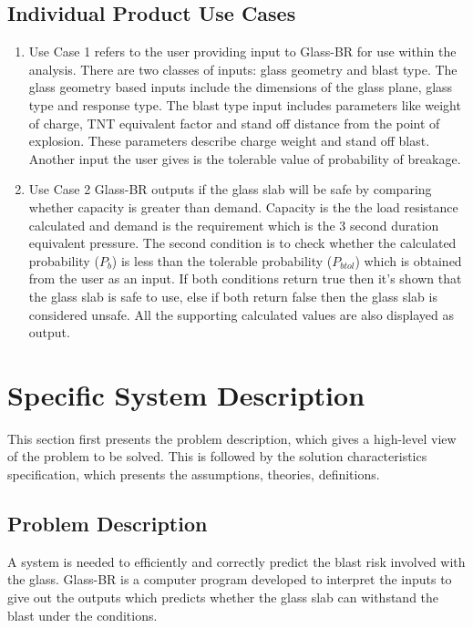 \documentclass[12pt]{article}
\begin{document}
\subsection{Individual Product Use Cases}
\label{Sec:IPUC}
\begin{enumerate}
\item{Use Case 1 refers to the user providing input to Glass-BR for use within the analysis. There are two classes of inputs: glass geometry and blast type. The glass geometry based inputs include the dimensions of the glass plane, glass type and response type. The blast type input includes parameters like weight of charge, TNT equivalent factor and stand off distance from the point of explosion. These parameters describe charge weight and stand off blast. Another input the user gives is the tolerable value of probability of breakage.}
\item{ Use Case 2 Glass-BR outputs if the glass slab will be safe by comparing whether capacity is greater than demand. Capacity is the the load resistance calculated and demand is the requirement which is the 3 second duration equivalent pressure. The second condition is to check whether the calculated probability ($P_{b}$) is less than the tolerable probability ($P_{btol}$) which is obtained from the user as an input. If both conditions return true then it's shown that the glass slab is safe to use, else if both return false then the glass slab is considered unsafe. All the supporting calculated values are also displayed as output.}
\end{enumerate}
\section{Specific System Description}
\label{Sec:SSD}
This section first presents the problem description, which gives a high-level view of the problem to be solved. This is followed by the solution characteristics specification, which presents the assumptions, theories, definitions.
\subsection{Problem Description}
\label{Sec:PD}
A system is needed to efficiently and correctly predict the blast risk involved with the glass. Glass-BR is a computer program developed to interpret the inputs to give out the outputs which predicts whether the glass slab can withstand the blast under the conditions.
\end{document}
